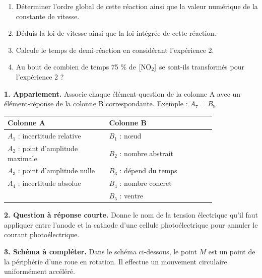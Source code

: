 \documentclass[11pt]{article}
\begin{document}
\begin{enumerate}
  \item Déterminer l'ordre global de cette réaction ainsi que la valeur numérique de la constante de vitesse.
  \item Déduis la loi de vitesse ainsi que la loi intégrée de cette réaction.
  \item Calcule le temps de demi-réaction en considérant l'expérience 2.
  \item Au bout de combien de temps 75 \% de $[\mathrm{NO_2}]$ se sont-ils transformés pour l'expérience 2 ?
\end{enumerate}



\noindent\textbf{1. Appariement.} Associe chaque élément-question de la colonne A avec un élément-réponse de la colonne B correspondante. Exemple : $A_7 = B_9$.

\begin{center}\renewcommand{\arraystretch}{1.6}
\begin{tabular}{|p{0.4\linewidth}|p{0.42\linewidth}|}
\hline
\textbf{Colonne A} & \textbf{Colonne B} \\
\hline
$A_1$ : incertitude relative & $B_1$ : nœud \\
\hline
$A_2$ : point d'amplitude maximale & $B_2$ : nombre abstrait \\
\hline
$A_3$ : point d'amplitude nulle & $B_3$ : dépend du temps \\
\hline
$A_4$ : incertitude absolue & $B_4$ : nombre concret \\
\hline
 & $B_5$ : ventre \\
\hline
\end{tabular}
\end{center}

\noindent\textbf{2. Question à réponse courte.} Donne le nom de la tension électrique qu'il faut appliquer entre l'anode et la cathode d'une cellule photoélectrique pour annuler le courant photoélectrique.

\medskip
\noindent\textbf{3. Schéma à compléter.} Dans le schéma ci-dessous, le point $M$ est un point de la périphérie d'une roue en rotation. Il effectue un mouvement circulaire uniformément accéléré.

\begin{center}
\end{center}
\end{document}
